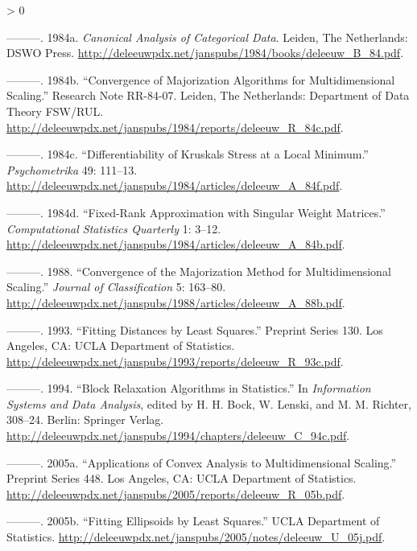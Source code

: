 \documentclass[
  12pt,
]{book}
\newlength{\cslhangindent}
\newenvironment{CSLReferences}[2] %
 {%
  \setlength{\parindent}{0pt}
  \ifodd #1 \everypar{\setlength{\hangindent}{\cslhangindent}}\ignorespaces\fi
  \ifnum #2 > 0
  \setlength{\parskip}{#2\baselineskip}
  \fi
 }%
 {}
\theoremstyle{definition}
\theoremstyle{definition}
\theoremstyle{definition}
\theoremstyle{definition}
\theoremstyle{remark}
\begin{document}
\begin{CSLReferences}{1}{0}
\leavevmode\hypertarget{ref-deleeuw_B_84}{}%
---------. 1984a. \emph{Canonical Analysis of Categorical Data}. Leiden, The Netherlands: DSWO Press. \url{http://deleeuwpdx.net/janspubs/1984/books/deleeuw_B_84.pdf}.

\leavevmode\hypertarget{ref-deleeuw_R_84c}{}%
---------. 1984b. {``Convergence of Majorization Algorithms for Multidimensional Scaling.''} Research Note RR-84-07. Leiden, The Netherlands: Department of Data Theory FSW/RUL. \url{http://deleeuwpdx.net/janspubs/1984/reports/deleeuw_R_84c.pdf}.

\leavevmode\hypertarget{ref-deleeuw_A_84f}{}%
---------. 1984c. {``Differentiability of Kruskals Stress at a Local Minimum.''} \emph{Psychometrika} 49: 111--13. \url{http://deleeuwpdx.net/janspubs/1984/articles/deleeuw_A_84f.pdf}.

\leavevmode\hypertarget{ref-deleeuw_A_84b}{}%
---------. 1984d. {``Fixed-Rank Approximation with Singular Weight Matrices.''} \emph{Computational Statistics Quarterly} 1: 3--12. \url{http://deleeuwpdx.net/janspubs/1984/articles/deleeuw_A_84b.pdf}.

\leavevmode\hypertarget{ref-deleeuw_A_88b}{}%
---------. 1988. {``Convergence of the Majorization Method for Multidimensional Scaling.''} \emph{Journal of Classification} 5: 163--80. \url{http://deleeuwpdx.net/janspubs/1988/articles/deleeuw_A_88b.pdf}.

\leavevmode\hypertarget{ref-deleeuw_R_93c}{}%
---------. 1993. {``Fitting Distances by Least Squares.''} Preprint Series 130. Los Angeles, CA: UCLA Department of Statistics. \url{http://deleeuwpdx.net/janspubs/1993/reports/deleeuw_R_93c.pdf}.

\leavevmode\hypertarget{ref-deleeuw_C_94c}{}%
---------. 1994. {``{Block Relaxation Algorithms in Statistics}.''} In \emph{Information Systems and Data Analysis}, edited by H. H. Bock, W. Lenski, and M. M. Richter, 308--24. Berlin: Springer Verlag. \url{http://deleeuwpdx.net/janspubs/1994/chapters/deleeuw_C_94c.pdf}.

\leavevmode\hypertarget{ref-deleeuw_R_05b}{}%
---------. 2005a. {``{Applications of Convex Analysis to Multidimensional Scaling}.''} Preprint Series 448. Los Angeles, CA: UCLA Department of Statistics. \url{http://deleeuwpdx.net/janspubs/2005/reports/deleeuw_R_05b.pdf}.

\leavevmode\hypertarget{ref-deleeuw_U_05j}{}%
---------. 2005b. {``{Fitting Ellipsoids by Least Squares}.''} UCLA Department of Statistics. \url{http://deleeuwpdx.net/janspubs/2005/notes/deleeuw_U_05j.pdf}.


\end{CSLReferences}
\end{document}
